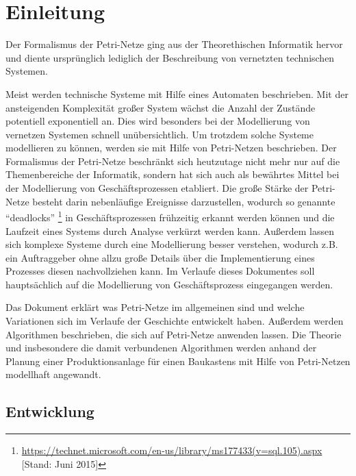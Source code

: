 \section{Einleitung}
Der Formalismus der Petri-Netze ging aus der Theorethischen Informatik hervor
und diente ursprünglich lediglich der Beschreibung von vernetzten technischen Systemen.

Meist werden technische Systeme mit Hilfe eines Automaten beschrieben.
Mit der ansteigenden Komplexität großer System wächst die Anzahl der Zustände potentiell exponentiell an.
Dies wird besonders bei der Modellierung von vernetzen Systemen schnell unübersichtlich.
Um trotzdem solche Systeme modellieren zu können, werden sie mit Hilfe von Petri-Netzen beschrieben.
Der Formalismus der Petri-Netze beschränkt sich heutzutage nicht mehr nur auf die Themenbereiche der Informatik,
sondern hat sich auch als bewährtes Mittel bei der Modellierung von Geschäftsprozessen etabliert.
Die große Stärke der Petri-Netze besteht darin nebenläufige Ereignisse darzustellen,
wodurch so genannte \enquote{deadlocks} \footnote{\url{https://technet.microsoft.com/en-us/library/ms177433(v=sql.105).aspx} [Stand: Juni 2015]}
in Geschäftsprozessen frühzeitig erkannt werden können und 
die Laufzeit eines Systems durch Analyse verkürzt werden kann.
Außerdem lassen sich komplexe Systeme durch eine Modellierung besser verstehen,
wodurch z.B. ein Auftraggeber ohne allzu große Details über die Implementierung eines Prozesses
diesen nachvollziehen kann.
Im Verlaufe dieses Dokumentes soll hauptsächlich auf die Modellierung von Geschäftsprozess eingegangen werden. 

Das Dokument erklärt was Petri-Netze im allgemeinen sind und
welche Variationen sich im Verlaufe der Geschichte entwickelt haben.
Außerdem werden Algorithmen beschrieben, die sich auf Petri-Netze anwenden lassen.
Die Theorie und insbesondere die damit verbundenen Algorithmen
werden anhand der Planung einer Produktionsanlage für einen Baukastens
mit Hilfe von Petri-Netzen modellhaft angewandt.


\subsection{Entwicklung}
